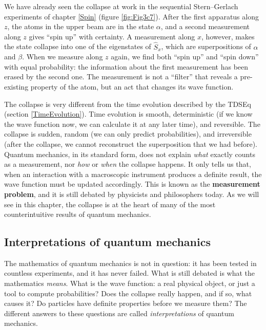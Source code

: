 \documentclass[
  english,
  9pt,
]{extbook}
\theoremstyle{definition}
\theoremstyle{definition}
\theoremstyle{definition}
\theoremstyle{definition}
\theoremstyle{remark}
\begin{document}
We have already seen the collapse at work in the sequential Stern--Gerlach experiments of chapter \ref{Spin} (figure \ref{fig:Fig3c7}). After the first apparatus along \(z\), the atoms in the upper beam are in the state \(\alpha\), and a second measurement along \(z\) gives ``spin up'' with certainty. A measurement along \(x\), however, makes the state collapse into one of the eigenstates of \(\hat{S}_x\), which are superpositions of \(\alpha\) and \(\beta\). When we measure along \(z\) again, we find both ``spin up'' and ``spin down'' with equal probability: the information about the first measurement has been erased by the second one. The measurement is not a ``filter'' that reveals a pre-existing property of the atom, but an act that changes its wave function.

The collapse is very different from the time evolution described by the TDSEq (section \ref{TimeEvolution}). Time evolution is smooth, deterministic (if we know the wave function now, we can calculate it at any later time), and reversible. The collapse is sudden, random (we can only predict probabilities), and irreversible (after the collapse, we cannot reconstruct the superposition that we had before). Quantum mechanics, in its standard form, does not explain \emph{what} exactly counts as a measurement, nor \emph{how} or \emph{when} the collapse happens. It only tells us that, when an interaction with a macroscopic instrument produces a definite result, the wave function must be updated accordingly. This is known as the \textbf{measurement problem}, and it is still debated by physicists and philosophers today. As we will see in this chapter, the collapse is at the heart of many of the most counterintuitive results of quantum mechanics.

\subsection{Interpretations of quantum mechanics}\label{Interpretations}

The mathematics of quantum mechanics is not in question: it has been tested in countless experiments, and it has never failed. What is still debated is what the mathematics \emph{means}. What is the wave function: a real physical object, or just a tool to compute probabilities? Does the collapse really happen, and if so, what causes it? Do particles have definite properties before we measure them? The different answers to these questions are called \emph{interpretations} of quantum mechanics.
\end{document}
